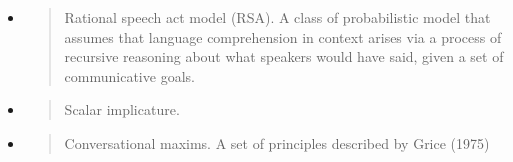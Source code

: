 \documentclass[]{elsarticle}
\begin{document}
\begin{itemize}
\item
  \begin{quote}
  Rational speech act model (RSA). A class of probabilistic model that
  assumes that language comprehension in context arises via a process of
  recursive reasoning about what speakers would have said, given a set
  of communicative goals.
  \end{quote}
\item
  \begin{quote}
  Scalar implicature.
  \end{quote}
\item
  \begin{quote}
  Conversational maxims. A set of principles described by Grice (1975)
  \end{quote}
\end{itemize}
\end{document}
